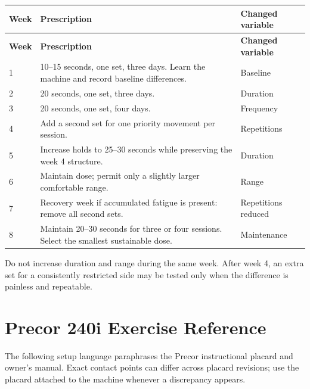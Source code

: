 \documentclass[10pt,letterpaper]{article}
\begin{document}
\begin{longtable}{@{}C{0.55in}L{4.85in}L{1.15in}@{}}
\toprule
{}
\color{white}\textbf{Week} & \color{white}\textbf{Prescription} & \color{white}\textbf{Changed variable} \\
\midrule
\endfirsthead
\toprule
{}
\color{white}\textbf{Week} & \color{white}\textbf{Prescription} & \color{white}\textbf{Changed variable} \\
\midrule
{} & 10--15 seconds, one set, three days. Learn the machine and record baseline differences. & Baseline \\
2 & 20 seconds, one set, three days. & Duration \\
3 & 20 seconds, one set, four days. & Frequency \\
4 & Add a second set for one priority movement per session. & Repetitions \\
5 & Increase holds to 25--30 seconds while preserving the week 4 structure. & Duration \\
6 & Maintain dose; permit only a slightly larger comfortable range. & Range \\
7 & Recovery week if accumulated fatigue is present: remove all second sets. & Repetitions reduced \\
8 & Maintain 20--30 seconds for three or four sessions. Select the smallest sustainable dose. & Maintenance \\
\bottomrule
\end{longtable}

Do not increase duration and range during the same week. After week 4, an extra set for a consistently restricted side may be tested only when the difference is painless and repeatable.

\Needspace{0.38\textheight}
\section{Precor 240i Exercise Reference}

The following setup language paraphrases the Precor instructional placard and owner's manual. Exact contact points can differ across placard revisions; use the placard attached to the machine whenever a discrepancy appears.
\end{document}
